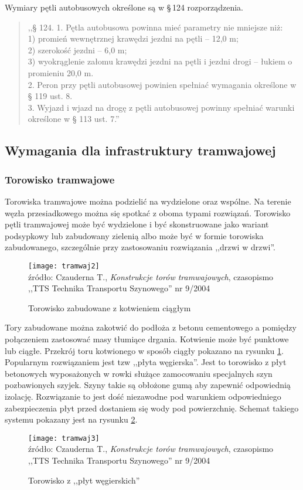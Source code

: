 \documentclass[twoside,12pt]{article}
\begin{document}
	Wymiary pętli autobusowych określone są w §\,124 rozporządzenia. 
	\begin{quote}
	,,§ 124. 1. Pętla autobusowa powinna mieć parametry nie mniejsze niż: \\
1) promień wewnętrznej krawędzi jezdni na pętli – 12,0 m; \\
2) szerokość jezdni – 6,0 m; \\
3) wyokrąglenie załomu krawędzi jezdni na pętli i jezdni drogi – łukiem o promieniu 20,0 m. \\
2. Peron przy pętli autobusowej powinien spełniać wymagania określone w § 119 ust. 8. \\
3. Wyjazd i wjazd na drogę z pętli autobusowej powinny spełniać warunki określone w § 113 ust. 7.''
	\end{quote}
	
	\subsection{Wymagania dla infrastruktury tramwajowej}	
	
	\subsubsection{Torowisko tramwajowe}
	Torowiska tramwajowe można podzielić na wydzielone oraz wspólne. Na terenie węzła przesiadkowego można się spotkać z oboma typami rozwiązań. Torowisko pętli tramwajowej może być wydzielone i być skonstruowane jako wariant podsypkowy lub zabudowany zielenią albo może być w formie torowiska zabudowanego, szczególnie przy zastosowaniu rozwiązania ,,drzwi w drzwi''. 
	\begin{figure}[H]
		\centering
		\caption{Torowisko zabudowane z kotwieniem ciągłym}
		\texttt{[image: tramwaj2]}\\
		\footnotesize{źródło: 	Czauderna T., \emph{Konstrukcje torów tramwajowych}, czasopismo ,,TTS Technika Transportu Szynowego'' %
		 nr 9/2004 \cite{czauderna}}
		\label{tramwaj2}
	\end{figure}
	
	Tory zabudowane można zakotwić do podłoża z betonu cementowego a pomiędzy połączeniem zastosować masy tłumiące drgania. Kotwienie może być punktowe lub ciągłe. Przekrój toru kotwionego w sposób ciągły pokazano na rysunku \ref{tramwaj2}. Popularnym rozwiązaniem jest tzw ,,płyta węgierska''. Jest to torowisko z płyt betonowych wyposażonych w rowki służące zamocowaniu specjalnych szyn pozbawionych szyjek. Szyny takie są obłożone gumą aby zapewnić odpowiednią izolację. Rozwiązanie to jest dość niezawodne pod warunkiem odpowiedniego zabezpieczenia płyt przed dostaniem się wody pod powierzchnię. Schemat takiego systemu pokazany jest na rysunku \ref{tramwaj3}.
	\begin{figure}[H]
		\centering
		\caption{Torowisko z ,,płyt węgierskich''}
		\texttt{[image: tramwaj3]}\\
		\footnotesize{źródło: 	Czauderna T., \emph{Konstrukcje torów tramwajowych}, czasopismo ,,TTS Technika Transportu Szynowego'' %
		 nr 9/2004 \cite{czauderna}}
		\label{tramwaj3}
	\end{figure}
	
\end{document}
